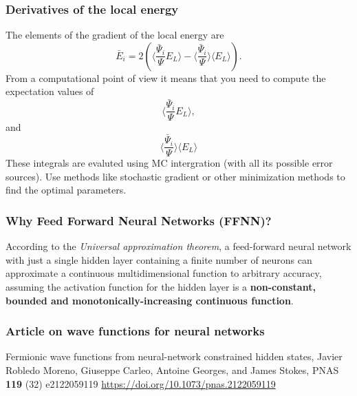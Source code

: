 \documentclass[11pt]{beamer} %
\begin{document}
\begin{frame}
\frametitle{Derivatives of the local energy}

The elements of the gradient of the local energy are 
\[
\bar{E}_{i}= 2\left( \langle \frac{\bar{\Psi}_{i}}{\Psi}E_L\rangle -\langle \frac{\bar{\Psi}_{i}}{\Psi}\rangle\langle E_L \rangle\right).
\]
From a computational point of view it means that you need to compute the expectation values of 
\[
\langle \frac{\bar{\Psi}_{i}}{\Psi}E_L\rangle,
\]
and
\[
\langle \frac{\bar{\Psi}_{i}}{\Psi}\rangle\langle E_L\rangle
\]
These integrals are evaluted using MC intergration (with all its possible error sources). Use methods like stochastic gradient or other minimization methods to find the optimal parameters.
\end{frame}

\begin{frame}
\frametitle{Why Feed Forward Neural Networks (FFNN)?}

According to the \emph{Universal approximation theorem}, a feed-forward
neural network with just a single hidden layer containing a finite
number of neurons can approximate a continuous multidimensional
function to arbitrary accuracy, assuming the activation function for
the hidden layer is a \textbf{non-constant, bounded and
monotonically-increasing continuous function}.
\end{frame}


\begin{frame}
\frametitle{Article on wave functions for neural networks}

Fermionic wave functions from neural-network constrained hidden states, 
Javier Robledo Moreno, Giuseppe Carleo, Antoine Georges, and James Stokes,
PNAS {\bf 119} (32) e2122059119 \url{https://doi.org/10.1073/pnas.2122059119}
\end{frame}
\end{document}
